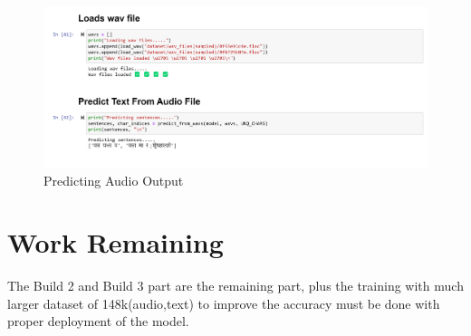 \begin{figure}[h]
    \centering
    \includegraphics[scale=0.4]{images/output1.png}
    \caption{Predicting Audio Output}
    \label{fig:my_label}
\end{figure}





\section{Work Remaining}
The Build 2 and Build 3 part are the remaining part, plus the training with much larger dataset of 148k(audio,text) to improve the accuracy must be done with proper deployment of the model.






\newpage
\renewcommand\bibname{REFERENCES} %










	

